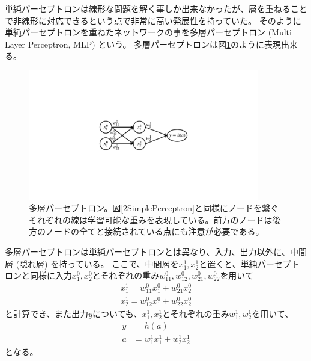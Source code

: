 単純パーセプトロンは線形な問題を解く事しか出来なかったが、層を重ねることで非線形に対応できるという点で非常に高い発展性を持っていた\cite{ApproximationSuperpositionsSigmoidalFunction}。
そのように単純パーセプトロンを重ねたネットワークの事を多層パーセプトロン (Multi Layer Perceptron, MLP) という。
多層パーセプトロンは図\ref{4MultiLayerPerceptron}のように表現出来る。

\begin{figure}[htbp]
 \centering
 \includegraphics[trim = 250 350 250 350, width=0.9\textwidth, clip]{Figure/2DeepLearning/4MultiLayerPerceptron.png}
 \caption[多層パーセプトロン]{多層パーセプトロン。図\ref{2SimplePerceptron}と同様にノードを繋ぐそれぞれの線は学習可能な重みを表現している。前方のノードは後方のノードの全てと接続されている点にも注意が必要である。}
 \label{4MultiLayerPerceptron}
\end{figure}

多層パーセプトロンは単純パーセプトロンとは異なり、入力、出力以外に、中間層 (隠れ層) を持っている。
ここで、中間層を$x^1_1,x^1_2$と置くと、単純パーセプトロンと同様に入力$x^0_1,x^0_2$とそれぞれの重み$w^0_{11},w^0_{12},w^0_{21},w^0_{22}$を用いて
\begin{equation}
 \begin{split}
  x^1_1 = w^0_{11}x^0_1 + w^0_{21}x^0_2 \\
  x^1_2 = w^0_{12}x^0_1 + w^0_{22}x^0_2
 \end{split} 
\end{equation}
と計算でき、また出力$y$についても、$x^1_1,x^1_2$とそれぞれの重み$w^1_{1},w^1_{2}$を用いて、
\begin{equation}
 \begin{split}
  y &= h(a)\\
  a &= w^1_{1}x^1_1 + w^1_{2}x^1_2
 \end{split}
\end{equation}
となる。

